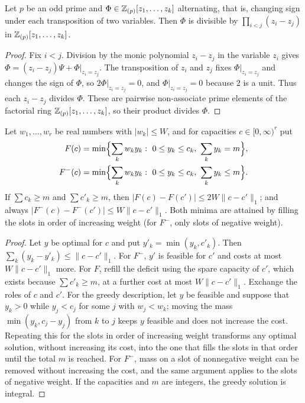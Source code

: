 \begin{lemma}\label{lem:alternating}
Let $p$ be an odd prime and $\Phi\in\mathbb{Z}_{(p)}[z_1,\dots,z_k]$ alternating, that is, changing sign under each transposition of two variables. Then $\Phi$ is divisible by $\prod_{i<j}(z_i-z_j)$ in $\mathbb{Z}_{(p)}[z_1,\dots,z_k]$.
\end{lemma}

\begin{proof}
Fix $i<j$. Division by the monic polynomial $z_i-z_j$ in the variable $z_i$ gives $\Phi=(z_i-z_j)\Psi+\Phi|_{z_i=z_j}$. The transposition of $z_i$ and $z_j$ fixes $\Phi|_{z_i=z_j}$ and changes the sign of $\Phi$, so $2\Phi|_{z_i=z_j}=0$, and $\Phi|_{z_i=z_j}=0$ because $2$ is a unit. Thus each $z_i-z_j$ divides $\Phi$. These are pairwise non-associate prime elements of the factorial ring $\mathbb{Z}_{(p)}[z_1,\dots,z_k]$, so their product divides $\Phi$.
\end{proof}

\begin{lemma}\label{lem:lp-lipschitz}
Let $w_1,\dots,w_r$ be real numbers with $|w_k|\le W$, and for capacities $c\in[0,\infty)^r$ put
\begin{align*}
F(c)&=\min\Bigl\{\sum_kw_ky_k:\ 0\le y_k\le c_k,\ \sum_ky_k=m\Bigr\},\\
F^-(c)&=\min\Bigl\{\sum_kw_ky_k:\ 0\le y_k\le c_k,\ \sum_ky_k\le m\Bigr\}.
\end{align*}
If $\sum c_k\ge m$ and $\sum c'_k\ge m$, then $|F(c)-F(c')|\le2W\|c-c'\|_1$; and always $|F^-(c)-F^-(c')|\le W\|c-c'\|_1$. Both minima are attained by filling the slots in order of increasing weight (for $F^-$, only slots of negative weight).
\end{lemma}

\begin{proof}
Let $y$ be optimal for $c$ and put $y'_k=\min(y_k,c'_k)$. Then $\sum_k(y_k-y'_k)\le\|c-c'\|_1$. For $F^-$, $y'$ is feasible for $c'$ and costs at most $W\|c-c'\|_1$ more. For $F$, refill the deficit using the spare capacity of $c'$, which exists because $\sum c'_k\ge m$, at a further cost at most $W\|c-c'\|_1$. Exchange the roles of $c$ and $c'$. For the greedy description, let $y$ be feasible and suppose that $y_k>0$ while $y_j<c_j$ for some $j$ with $w_j<w_k$; moving the mass $\min(y_k,c_j-y_j)$ from $k$ to $j$ keeps $y$ feasible and does not increase the cost. Repeating this for the slots in order of increasing weight transforms any optimal solution, without increasing its cost, into the one that fills the slots in that order until the total $m$ is reached. For $F^-$, mass on a slot of nonnegative weight can be removed without increasing the cost, and the same argument applies to the slots of negative weight. If the capacities and $m$ are integers, the greedy solution is integral.
\end{proof}

